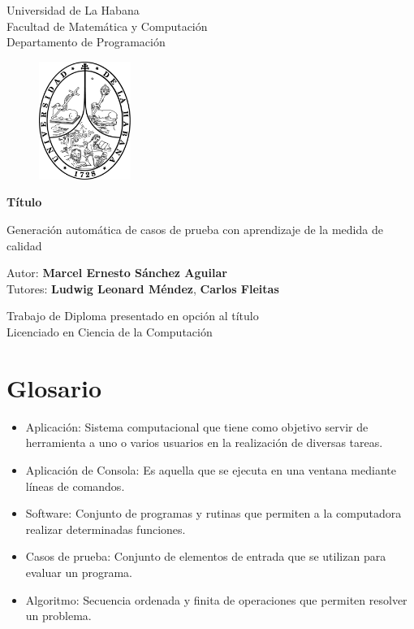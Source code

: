 \documentclass[a4paper,12pt]{book}
\begin{document}
	\begin{titlepage}
		\begin{center}
			\vspace*{-1in}
			Universidad de La Habana \\
			Facultad de Matemática y Computación \\
			Departamento de Programación \\
			\vspace*{0.15in}
			\begin{figure}[htb]
				\begin{center}
					\includegraphics[width=3cm]{./Graphics/uhlogo.pdf}
				\end{center}
			\end{figure}
			
			\vspace*{0.3in}
			\textbf{Título} \\
			\begin{large}
			Generación automática de casos de prueba con aprendizaje de la medida de calidad \\
			\end{large}
			\vspace*{0.6in}
			Autor: \textbf{Marcel Ernesto Sánchez Aguilar} \\
			Tutores: \textbf{Ludwig Leonard Méndez}, \textbf{Carlos Fleitas}
			
			
			\vspace*{0.6in}
			Trabajo de Diploma presentado en opción al título\\
			Licenciado en Ciencia de la Computación
		\end{center}
	\end{titlepage}

\tableofcontents

\chapter*{Glosario}
	\begin{itemize}
		\item Aplicación: Sistema computacional que tiene como objetivo servir de herramienta a uno o varios usuarios en la realización de diversas tareas.
		\item Aplicación de Consola: Es aquella que se ejecuta en una ventana mediante líneas de comandos.
		\item Software: Conjunto de programas y rutinas que permiten a la computadora realizar determinadas funciones.
		\item Casos de prueba: Conjunto de elementos de entrada que se utilizan para evaluar un programa.
		\item Algoritmo: Secuencia ordenada y finita de operaciones que permiten resolver un problema.
	\end{itemize}
	
\end{document}
